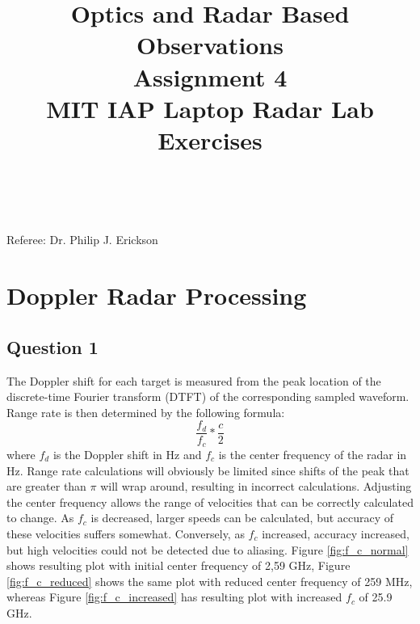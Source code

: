 \documentclass{article}
\title{\textbf {Optics and Radar Based Observations} \\ Assignment 4\\ MIT IAP Laptop Radar Lab Exercises} %
\author{\authorivan\\\authoranu}
\begin{document}
\maketitle %

\centerline{Referee: Dr. Philip J. Erickson}

\setlength\parindent{0pt} %

\renewcommand{\labelenumi}{\alph{enumi}.} %
\clearpage

\tableofcontents

\listoffigures

\clearpage


\section{Doppler Radar Processing}

\subsection{Question 1}
The Doppler shift for each target is measured from the peak location of the discrete-time Fourier transform (DTFT) of the corresponding sampled waveform. Range rate is then determined by the following formula:
\begin{equation}
\label{eq:first}
\frac{f_d}{f_c}*\frac{c}{2}
\end{equation}
where $f_d$ is the Doppler shift in Hz and $f_c$ is the center frequency of the radar in Hz. Range rate calculations will obviously be limited since shifts of the peak that are greater than $\pi$ will wrap around, resulting in incorrect calculations. Adjusting the center frequency allows the range of velocities that can be correctly calculated to change. As $f_c$ is decreased, larger speeds can be calculated, but accuracy of these velocities suffers somewhat. Conversely, as $f_c$ increased, accuracy increased, but high velocities could not be detected due to aliasing. \cite{DavenportWaters:2010dsp} Figure \ref{fig:f_c_normal} shows resulting plot with initial center frequency of 2,59 GHz, Figure \ref{fig:f_c_reduced} shows the same plot with reduced center frequency of 259 MHz, whereas Figure \ref{fig:f_c_increased} has resulting plot with increased $f_c$ of 25.9 GHz.
\end{document}

